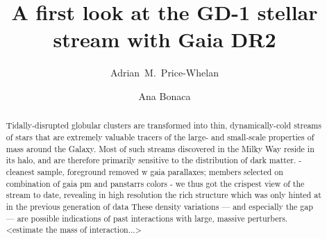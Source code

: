 \documentclass[modern]{aastex62}
\newcommand{\acronym}[1]{{\small{#1}}}
\newcommand{\gaia}{\textsl{Gaia}}
\newcommand{\pans}{\textsl{Pan-STARRS}}
\newcommand{\DR}{\acronym{DR2}}
\begin{document}
\sloppy\sloppypar\raggedbottom\frenchspacing %

\title{A first look at the GD-1 stellar stream with Gaia DR2}

\author[0000-0003-0872-7098]{Adrian~M.~Price-Whelan}

\author[0000-0002-7846-9787]{Ana Bonaca}


\begin{abstract}\noindent %
Tidally-disrupted globular clusters are transformed into thin, dynamically-cold streams
of stars that are extremely valuable tracers of the large- and small-scale
properties of mass around the Galaxy.
Most of such streams discovered in the Milky Way reside in its halo, and are therefore primarily sensitive to the distribution of dark matter.
- cleanest sample, foreground removed w gaia parallaxes; members selected on combination of gaia pm and panstarrs colors
- we thus got the crispest view of the stream to date, revealing in high resolution the rich structure which was only hinted at in the previous generation of data
These density variations --- and especially the gap --- are possible indications
of past interactions with large, massive perturbers.
<estimate the mass of interaction...>
%
\end{abstract}
\end{document}
